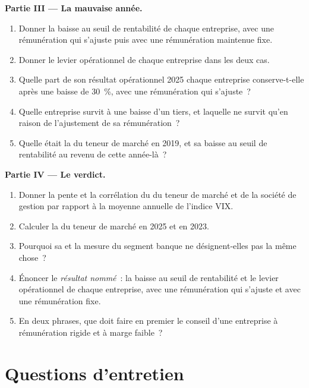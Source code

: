 \begin{problem}
\medskip\noindent\textbf{Partie III --- La mauvaise année.}
\begin{enumerate}[resume]
\item Donner la baisse au seuil de rentabilité de chaque entreprise, avec une rémunération qui s'ajuste puis avec une rémunération maintenue fixe.
\item Donner le levier opérationnel de chaque entreprise dans les deux cas.
\item Quelle part de son résultat opérationnel 2025 chaque entreprise conserve-t-elle après une baisse de 30~\%, avec une rémunération qui s'ajuste~?
\item Quelle entreprise survit à une baisse d'un tiers, et laquelle ne survit qu'en raison de l'ajustement de sa rémunération~?
\item Quelle était la  du teneur de marché en 2019, et sa baisse au seuil de rentabilité au revenu de cette année-là~?
\end{enumerate}

\medskip\noindent\textbf{Partie IV --- Le verdict.}
\begin{enumerate}[resume]
\item Donner la pente et la corrélation du  du teneur de marché et de la société de gestion par rapport à la moyenne annuelle de l'indice VIX.
\item Calculer la  du teneur de marché en 2025 et en 2023.
\item Pourquoi sa  et la mesure du segment banque ne désignent-elles pas la même chose~?
\item Énoncer le \emph{résultat nommé}~: la baisse au seuil de rentabilité et le levier opérationnel de chaque entreprise, avec une rémunération qui s'ajuste et avec une rémunération fixe.
\item En deux phrases, que doit faire en premier le conseil d'une entreprise à rémunération rigide et à marge faible~?
\end{enumerate}
\end{problem}

\section{Questions d'entretien}

